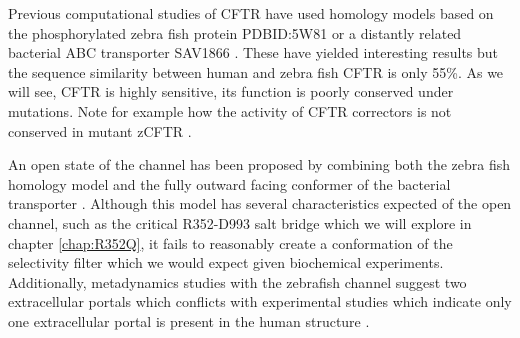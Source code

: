 \begin{enumerate}
\end{enumerate}



Previous computational studies of CFTR have used homology models based on the phosphorylated zebra fish protein PDBID:5W81 \cite{zhang2017a} or a distantly related bacterial ABC transporter SAV1866 \cite{dawson2006, Hoffmann2018}. These have yielded interesting results but the sequence similarity between human and zebra fish CFTR is only 55\%. As we will see, CFTR is highly sensitive, its function is poorly conserved under mutations. Note for example how the activity of CFTR correctors is not conserved in mutant zCFTR \cite{laselva2019}.

An open state of the channel has been proposed by combining both the zebra fish homology model and the fully outward facing conformer of the bacterial transporter \cite{Hoffmann2018}. Although this model has several characteristics expected of the open channel, such as the critical R352-D993 salt bridge which we will explore in chapter \ref{chap:R352Q}, it fails to reasonably create a conformation of the selectivity filter which we would expect given biochemical experiments. Additionally, metadynamics studies with the zebrafish channel suggest two extracellular portals which conflicts with experimental studies which indicate only one extracellular portal is present in the human structure \cite{linsdell2018,farkas2020}.



